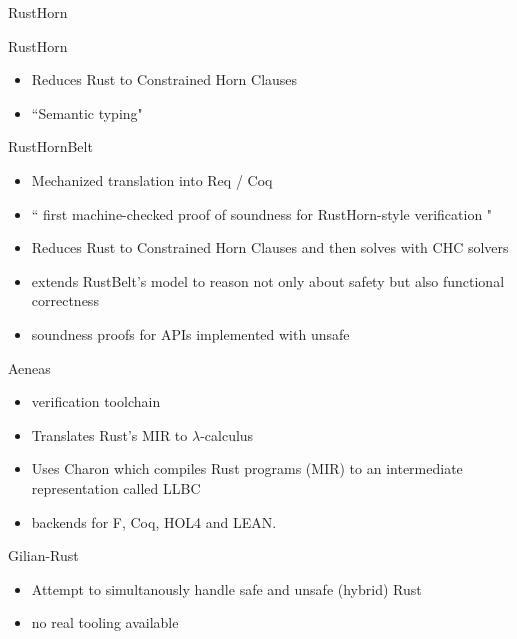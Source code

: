 \documentclass{beamer}
\begin{document}
\begin{frame}{RustHorn} 
\begin{block}{RustHorn}
\begin{itemize}
\item Reduces Rust to Constrained Horn Clauses
\item ``Semantic typing"
\end{itemize}
\end{block}
\begin{block}{RustHornBelt}
\begin{itemize}
\item Mechanized translation into Req / Coq
\item ``
first machine-checked proof of soundness for RustHorn-style verification
"
\item Reduces Rust to Constrained Horn Clauses and then solves with CHC solvers
\item extends RustBelt’s model to reason not only about safety but also functional correctness
\item soundness proofs for APIs implemented with unsafe
\end{itemize}
\end{block}

\end{frame}

\begin{frame} {Aeneas}

\begin{itemize}
\item 
 verification toolchain
\item
Translates Rust’s MIR to $\lambda$-calculus
\item Uses Charon which compiles Rust programs (MIR) to an intermediate representation called LLBC
\item
backends for F\*, Coq, HOL4 and LEAN.
\end{itemize}
\end{frame} 



\begin{frame} {Gilian-Rust}

\begin{itemize}
\item 
Attempt to simultanously handle safe and unsafe (hybrid) Rust
\item 
no real tooling available
\end{itemize}
\end{frame} 
\end{document}

